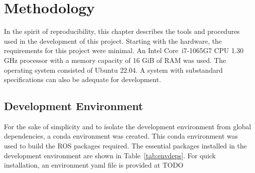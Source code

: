 \chapter{Methodology}\label{cha:methodology}

    In the spirit of reproducibility, this chapter describes the tools and procedures used in the development of this project. Starting with the hardware, the requirements for this project were minimal. An Intel\textsuperscript{\textregistered} Core\texttrademark\ i7-1065G7 CPU 1.30 GHz processor with a memory capacity of 16 GiB of RAM was used. The operating system consisted of Ubuntu 22.04. A system with substandard specifications can also be adequate for development.

\section{Development Environment}

    For the sake of simplicity and to isolate the development environment from global dependencies, a \textsf{conda} environment was created. This \textsf{conda} environment was used to build the \ac{ROS} packages required. The essential packages installed in the development environment are shown in Table~\ref{tab:envdeps}. For quick installation, an environment yaml file is provided at TODO

